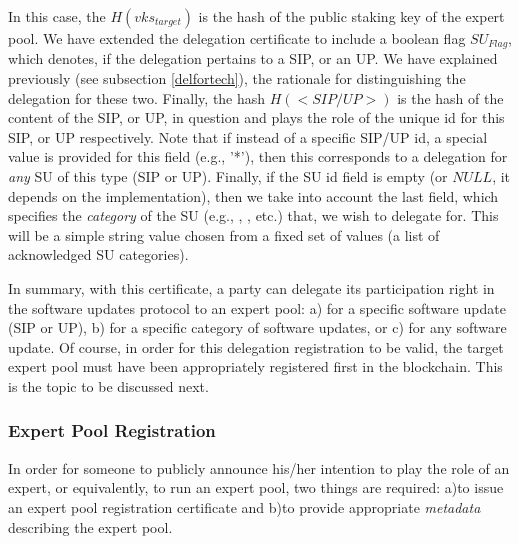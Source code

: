 In this case, the $H(vks_{target})$ is the hash of the public staking key of the expert pool. We have extended the delegation certificate to include a boolean flag $SU_{Flag}$, which denotes, if the delegation pertains to a SIP, or an UP. We have explained previously (see subsection \ref{delfortech}), the rationale for distinguishing the delegation for these two. Finally, the hash $H(<SIP/UP>)$ is the hash of the content of the SIP, or UP, in question and plays the role of the unique id for this SIP, or UP respectively. Note that if instead of a specific SIP/UP id, a special value is provided for this field (e.g., '*'), then this corresponds to a delegation for \emph{any} SU of this type (SIP or UP). Finally, if the SU id field is empty (or $NULL$, it depends on the implementation), then we take into account the last field, which specifies the \emph{category} of the SU (e.g., , , etc.) that, we wish to delegate for. This will be a simple string value chosen from a fixed set of values (a list of acknowledged SU categories). 

In summary, with this certificate, a party can delegate its participation right in the software updates protocol to an expert pool: a) for a specific software update (SIP or UP), b) for a specific category of software updates, or c) for any software update. Of course, in order for this delegation registration to be valid, the target expert pool must have been appropriately registered first in the blockchain. This is the topic to be discussed next.

\subsubsection*{Expert Pool Registration}
In order for someone to publicly announce his/her intention to play the role of an expert, or equivalently, to run an expert pool, two things are required: a)to issue an expert pool registration certificate and b)to provide appropriate \emph{metadata} describing the expert pool.

